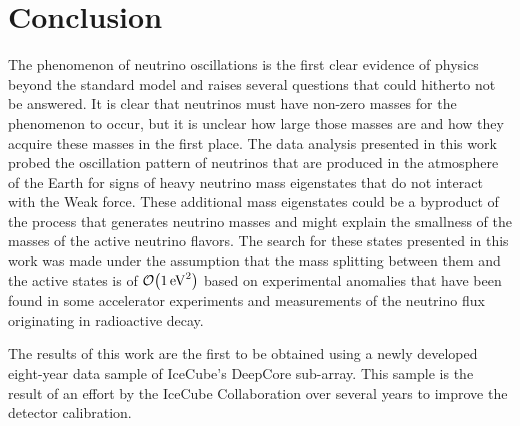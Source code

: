 \chapter{Conclusion}

The phenomenon of neutrino oscillations is the first clear evidence of physics beyond the standard model and raises several questions that could hitherto not be answered. It is clear that neutrinos must have non-zero masses for the phenomenon to occur, but it is unclear how large those masses are and how they acquire these masses in the first place. The data analysis presented in this work probed the oscillation pattern of neutrinos that are produced in the atmosphere of the Earth for signs of heavy neutrino mass eigenstates that do not interact with the Weak force. These additional mass eigenstates could be a byproduct of the process that generates neutrino masses and might explain the smallness of the masses of the active neutrino flavors. The search for these states presented in this work was made under the assumption that the mass splitting between them and the active states is of $\order{\SI{1}{\electronvolt\squared}}$ based on experimental anomalies that have been found in some accelerator experiments and measurements of the neutrino flux originating in radioactive decay.

The results of this work are the first to be obtained using a newly developed eight-year data sample of IceCube's DeepCore sub-array. This sample is the result of an effort by the IceCube Collaboration over several years to improve the detector calibration.
